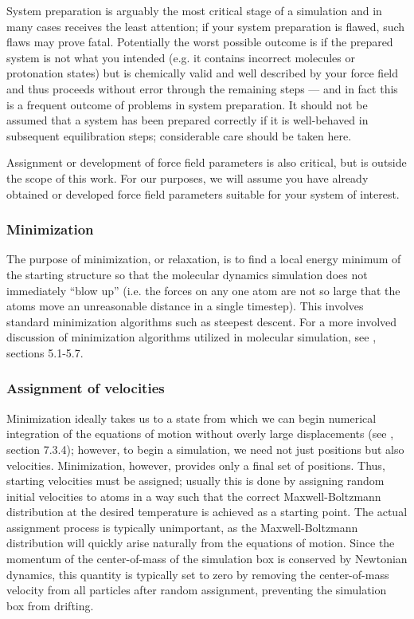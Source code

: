 \documentclass[9pt,bestpractices]{livecoms}
\begin{document}
System preparation is arguably the most critical stage of a simulation and in many cases receives the least attention; if your system preparation is flawed, such flaws may prove fatal.
Potentially the worst possible outcome is if the prepared system is not what you intended (e.g. it contains incorrect molecules or protonation states) but is chemically valid and well described by your force field and thus proceeds without error through the remaining steps --- and in fact this is a  frequent outcome of problems in system preparation.
It should not be assumed that a system has been prepared correctly if it is well-behaved in subsequent equilibration steps; considerable care should be taken here.

Assignment or development of force field parameters is also critical, but is outside the scope of this work.
For our purposes, we will assume you have already obtained or developed force field parameters suitable for your system of interest.

\subsubsection{Minimization}

The purpose of minimization, or relaxation, is to find a local energy minimum of the starting structure so that the molecular dynamics simulation does not immediately ``blow up'' (i.e. the forces on any one atom are not so large that the atoms move an unreasonable distance in a single timestep).
This involves standard minimization algorithms such as steepest descent.
For a more involved discussion of minimization algorithms utilized in molecular simulation, see \citet{LeachBook}, sections 5.1-5.7.

\subsubsection{Assignment of velocities}
\label{sec:velocities}
Minimization ideally takes us to a state from which we can begin numerical integration of the equations of motion without overly large displacements (see \citet{LeachBook}, section 7.3.4); however, to begin a simulation, we need not just positions but also velocities.
Minimization, however, provides only a final set of positions.
Thus, starting velocities must be assigned; usually this is done by assigning random initial velocities to atoms in a way such that the correct Maxwell-Boltzmann distribution at the desired temperature is achieved as a starting point.
The actual assignment process is typically unimportant, as the Maxwell-Boltzmann distribution will quickly arise naturally from the equations of motion.
Since the momentum of the center-of-mass of the simulation box is conserved by Newtonian dynamics, this quantity is typically set to zero by removing the center-of-mass velocity from all particles after random assignment, preventing the simulation box from drifting.
\end{document}
